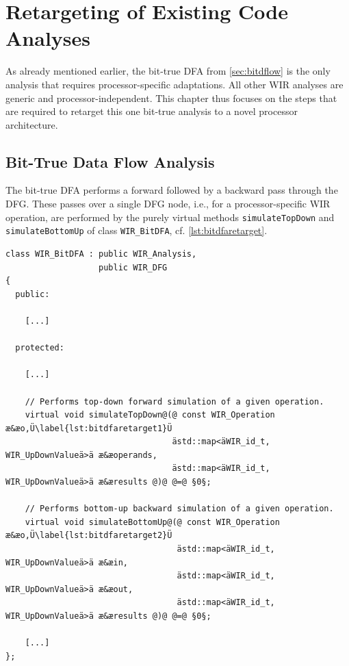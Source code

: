 \chapter{Retargeting of Existing Code Analyses}
\label{chap:anaretarget}
\renewcommand{\sectiontitle}{}

As already mentioned earlier, the bit-true \gls{DFA} from \cref{sec:bitdflow} is the only analysis that requires processor-specific adaptations.
All other \gls{WIR} analyses are generic and processor-independent.
This chapter thus focuses on the steps that are required to retarget this one bit-true analysis to a novel processor architecture.


\section{Bit-True Data Flow Analysis}
\label{sec:bitdflowretarget}

The bit-true \gls{DFA} performs a forward followed by a backward pass through the \gls{DFG}.
These passes over a single \gls{DFG} node, i.e., for a processor-specific \gls{WIR} operation, are performed by the purely virtual methods \texttt{simulateTopDown} and \texttt{simulateBottomUp} of class \texttt{WIR\_BitDFA}, cf. \cref{lst:bitdfaretarget}.

\begin{lstlisting}[style=code,float=h,caption={Interface of Class \texttt{WIR\_BitDFA} to be Retargeted},label=lst:bitdfaretarget]
class WIR_BitDFA : public WIR_Analysis,
                   public WIR_DFG
{
  public:

    [...]

  protected:

    [...]

    // Performs top-down forward simulation of a given operation.
    virtual void simulateTopDown@(@ const WIR_Operation æ&æo,Ü\label{lst:bitdfaretarget1}Ü
                                  ästd::map<äWIR_id_t, WIR_UpDownValueä>ä æ&æoperands,
                                  ästd::map<äWIR_id_t, WIR_UpDownValueä>ä æ&æresults @)@ @=@ §0§;

    // Performs bottom-up backward simulation of a given operation.
    virtual void simulateBottomUp@(@ const WIR_Operation æ&æo,Ü\label{lst:bitdfaretarget2}Ü
                                   ästd::map<äWIR_id_t, WIR_UpDownValueä>ä æ&æin,
                                   ästd::map<äWIR_id_t, WIR_UpDownValueä>ä æ&æout,
                                   ästd::map<äWIR_id_t, WIR_UpDownValueä>ä æ&æresults @)@ @=@ §0§;

    [...]
};
\end{lstlisting}

